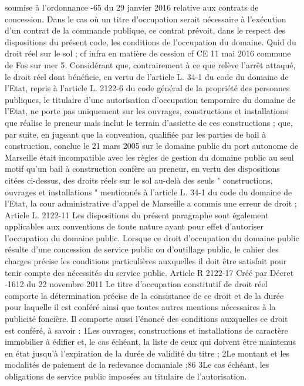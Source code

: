 \documentclass[11pt,a4paper]{report}
\begin{document}
soumise à l'ordonnance -65 du 29 janvier 2016 relative aux contrats de concession.
Dans le cas où un titre d'occupation serait nécessaire à l'exécution d'un contrat de la commande publique, ce
contrat prévoit, dans le respect des dispositions du présent code, les conditions de l'occupation du domaine.
Quid du droit réel sur le sol ; cf infra en matière de cession
cf CE 11 mai 2016 commune de Fos sur mer 
5. Considérant que, contrairement à ce que relève l'arrêt attaqué, le droit réel dont bénéficie, en vertu de
l'article L. 34-1 du code du domaine de l'Etat, repris à l'article L. 2122-6 du code général de la propriété des
personnes publiques, le titulaire d'une autorisation d'occupation temporaire du domaine de l'Etat, ne porte pas
uniquement sur les ouvrages, constructions et installations que réalise le preneur mais inclut le terrain d'assiette
de ces constructions ; que, par suite, en jugeant que la convention, qualifiée par les parties de bail à
construction, conclue le 21 mars 2005 sur le domaine public du port autonome de Marseille était incompatible
avec les règles de gestion du domaine public au seul motif qu'un bail à construction confère au preneur, en vertu
des dispositions citées ci-dessus, des droits réels sur le sol au-delà des seuls " constructions, ouvrages et
installations " mentionnés à l'article L. 34-1 du code du domaine de l'Etat, la cour administrative d'appel de
Marseille a commis une erreur de droit ;
Article L. 2122-11 Les dispositions du présent paragraphe sont également applicables aux conventions de toute
nature ayant pour effet d'autoriser l'occupation du domaine public.
Lorsque ce droit d'occupation du domaine public résulte d'une concession de service public ou d'outillage
public, le cahier des charges précise les conditions particulières auxquelles il doit être satisfait pour tenir
compte des nécessités du service public.
Article R 2122-17 Créé par Décret -1612 du 22 novembre 2011 Le titre d'occupation constitutif de droit
réel comporte la détermination précise de la consistance de ce droit et de la durée pour laquelle il est conféré
ainsi que toutes autres mentions nécessaires à la publicité foncière.
Il comporte aussi l'énoncé des conditions auxquelles ce droit est conféré, à savoir :
1\degre  Les ouvrages, constructions et installations de caractère immobilier à édifier et, le cas échéant, la liste de
ceux qui doivent être maintenus en état jusqu'à l'expiration de la durée de validité du titre ;
2\degre  Le montant et les modalités de paiement de la redevance domaniale ;86
3\degre  Le cas échéant, les obligations de service public imposées au titulaire de l'autorisation.
\end{document}
